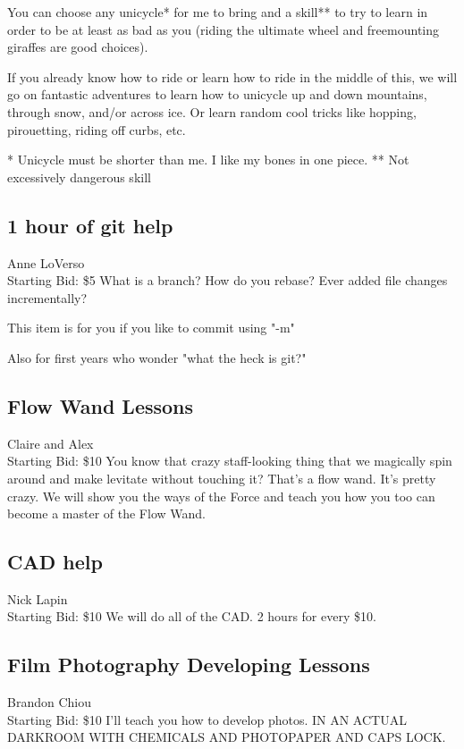\documentclass[11pt]{article}
\begin{document}
You can choose any unicycle* for me to bring and a skill** to try to learn in order to be at least as bad as you (riding the ultimate wheel and freemounting giraffes are good choices). 

If you already know how to ride or learn how to ride in the middle of this, we will go on fantastic adventures to learn how to unicycle up and down mountains, through snow, and/or across ice. Or learn random cool tricks like hopping, pirouetting, riding off curbs, etc.

* Unicycle must be shorter than me. I like my bones in one piece.
** Not excessively dangerous skill
\subsection{1 hour of git help}
Anne LoVerso
\\
Starting Bid: \$5
\newline
What is a branch?  How do you rebase?  Ever added file changes incrementally?

This item is for you if you like to commit using "-m"

Also for first years who wonder "what the heck is git?"
\subsection{Flow Wand Lessons}
Claire and Alex
\\
Starting Bid: \$10
\newline
You know that crazy staff-looking thing that we magically spin around and make levitate without touching it? That's a flow wand. It's pretty crazy. We will show you the ways of the Force and teach you how you too can become a master of the Flow Wand.
\subsection{CAD help}
Nick Lapin
\\
Starting Bid: \$10
\newline
We will do all of the CAD. 2 hours for every \$10.
\subsection{Film Photography Developing Lessons}
Brandon Chiou
\\
Starting Bid: \$10
\newline
I'll teach you how to develop photos. IN AN ACTUAL DARKROOM WITH CHEMICALS AND PHOTOPAPER AND CAPS LOCK.
\end{document}
